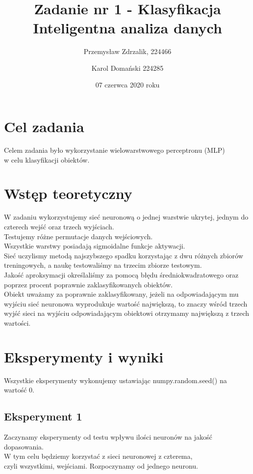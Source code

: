 \documentclass[12pt]{article}
\title{{\bf Zadanie nr 1 - Klasyfikacja}\linebreak
Inteligentna analiza danych}
\author{Przemysław Zdrzalik, 224466 \and Karol Domański 224285}
\date{07 czerwca 2020 roku}
\begin{document}
\clearpage\maketitle
\thispagestyle{empty}
\newpage
\setcounter{page}{1}
\section{Cel zadania}

Celem zadania było wykorzystanie wielowarstwowego perceptronu (MLP) \\w celu klasyfikacji obiektów.

\section{Wstęp teoretyczny}

W zadaniu wykorzystujemy sieć neuronową o jednej warstwie ukrytej, jednym do czterech wejść oraz trzech wyjściach. \\Testujemy różne permutacje danych wejściowych. \\ Wszystkie warstwy posiadają sigmoidalne funkcje aktywacji. \\Sieć uczylismy metodą najszybszego spadku  korzystając z dwu różnych zbiorów treningowych, a naukę testowaliśmy na trzecim zbiorze testowym.\\
Jakość aproksymacji określaliśmy za pomocą błędu średniokwadratowego oraz poprzez procent poprawnie zaklasyfikowanych obiektów.\\ Obiekt uważamy za poprawnie zaklasyfikowany, jeżeli na odpowiadającym mu wyjściu sieć neuronowa wyprodukuje wartość największą, to znaczy wśród trzech wyjść sieci na wyjściu odpowiadającym obiektowi otrzymamy największą z trzech wartości.

\newpage
\section{Eksperymenty i wyniki} 

Wszystkie eksperymenty wykonujemy ustawiając numpy.random.seed() na wartość 0.

\subsection {Eksperyment 1}

Zaczynamy eksperymenty od testu wpływu ilości neuronów na jakość dopasowania.\\ W tym celu będziemy korzystać z sieci neuronowej z czterema,\\ czyli wszystkimi, wejściami. Rozpoczynamy od jednego neuronu.\\
\end{document}
